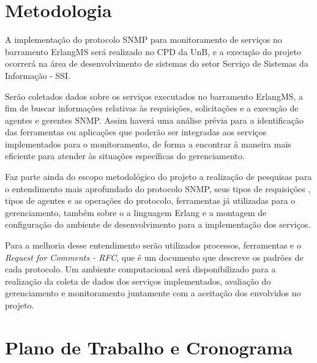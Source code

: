 \documentclass[qualidr]{eesc}
\begin{document}
\section{Metodologia}

A implementação do protocolo SNMP para monitoramento de serviços no barramento ErlangMS será realizado no CPD da UnB, e a execução do projeto ocorrerá  na área de desenvolvimento de sistemas do setor Serviço de Sistemas da Informação - SSI. 

Serão coletados dados sobre os serviços executados no barramento ErlangMS, a fim de buscar informações relativas às requisições, solicitações e a execução de agentes e gerentes SNMP. Assim haverá uma análise prévia para a identificação das ferramentas ou aplicações que poderão ser integradas aos serviços implementados para o monitoramento, de forma a encontrar à maneira mais eficiente para atender às situações específicas do gerenciamento.

Faz parte ainda do escopo metodológico do projeto a realização de pesquisas para o entendimento mais aprofundado do protocolo SNMP, seus tipos de requisições , tipos de agentes e as operações do protocolo, ferramentas já utilizadas para o gerenciamento, também sobre o a linguagem Erlang e a montagem de configuração do ambiente de desenvolvimento para a implementação dos serviços. 

Para a melhoria desse entendimento serão utilizados  processos, ferramentas e o \textit{Request for Comments - RFC}, que  é um documento que descreve os padrões de cada protocolo. Um ambiente computacional será disponibilizado para a realização da coleta de dados dos serviços implementados, avaliação do gerenciamento e monitoramento juntamente com a aceitação dos envolvidos no projeto.

\section{Plano de Trabalho e Cronograma}
\end{document}
